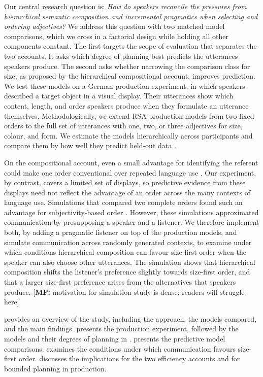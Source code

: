 \documentclass[10pt,a4paper,fleqn]{article}
\newcommand{\mf}[1]{\textcolor{shimmer-main}{[\textbf{MF: }{#1}]}}
\begin{document}
Our central research question is: \emph{How do speakers reconcile the pressures from hierarchical semantic composition and incremental pragmatics when selecting and ordering adjectives?}
We address this question with two matched model comparisons, which we cross in a factorial design while holding all other components constant.
The first targets the scope of evaluation that separates the two accounts.
It asks which degree of planning best predicts the utterances speakers produce.
The second asks whether narrowing the comparison class for size, as proposed by the hierarchical compositional account, improves prediction.
We test these models on a German production experiment, in which speakers described a target object in a visual display.
Their utterances show which content, length, and order speakers produce when they formulate an utterance themselves.
Methodologically, we extend RSA production models from two fixed orders to the full set of utterances with one, two, or three adjectives for size, colour, and form.
We estimate the models hierarchically across participants and compare them by how well they predict held-out data \citep{vehtari2017practical}.

On the compositional account, even a small advantage for identifying the referent could make one order conventional over repeated language use \citep[p.~7:19]{scontras2019grammatical}.
Our experiment, by contrast, covers a limited set of displays, so predictive evidence from these displays need not reflect the advantage of an order across the many contexts of language use.
Simulations that compared two complete orders found such an advantage for subjectivity-based order \citep{franke2019subjectivity}.
However, these simulations approximated communication by presupposing a speaker and a listener.
We therefore implement both, by adding a pragmatic listener on top of the production models, and simulate communication across randomly generated contexts, to examine under which conditions hierarchical composition can favour size-first order when the speaker can also choose other utterances.
The simulation shows that hierarchical composition shifts the listener's preference slightly towards size-first order, and that a larger size-first preference arises from the alternatives that speakers produce.
\mf{motivation for simulation-study is dense; readers will struggle here}

 provides an overview of the study, including the approach, the models compared, and the main findings.
 presents the production experiment, followed by the models and their degrees of planning in .
 presents the predictive model comparisons;  examines the conditions under which communication favours size-first order.
 discusses the implications for the two efficiency accounts and for bounded planning in production.
\end{document}
